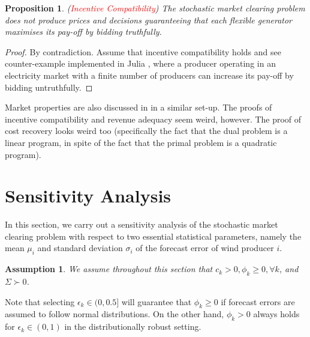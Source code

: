 \documentclass{article}
\newtheorem{proposition}{Proposition}
\newtheorem{assumption}{Assumption}
\begin{document}
\begin{proposition}
(\textcolor{red}{Incentive Compatibility}) The stochastic market clearing problem does not produce prices and decisions guaranteeing that each flexible generator maximises its pay-off by bidding truthfully.
\end{proposition}
\begin{proof}
By contradiction. Assume that incentive compatibility holds and see counter-example implemented in Julia \cite{SMER2022}, where a producer operating in an electricity market with a finite number of producers can increase its pay-off by bidding untruthfully.
\end{proof}

Market properties are also discussed in \cite{Ratha2019} in a similar set-up. The proofs of incentive compatibility and revenue adequacy seem weird, however. The proof of cost recovery looks weird too (specifically the fact that the dual problem is a linear program, in spite of the fact that the primal problem is a quadratic program). 

\section{Sensitivity Analysis}

In this section, we carry out a sensitivity analysis of the stochastic market clearing problem with respect to two essential statistical parameters, namely the mean $\mu_i$ and standard deviation $\sigma_i$ of the forecast error of wind producer $i$.

\begin{assumption}
We assume throughout this section that $c_k > 0,\phi_k \ge 0, \forall k$, and $\Sigma \succ 0$.
\end{assumption}

Note that selecting $\epsilon_k \in (0, 0.5]$ will guarantee that $\phi_k \ge 0$ if forecast errors are assumed to follow normal distributions. On the other hand, $\phi_k > 0$ always holds for $\epsilon_k \in (0, 1)$ in the distributionally robust setting.
\end{document}
